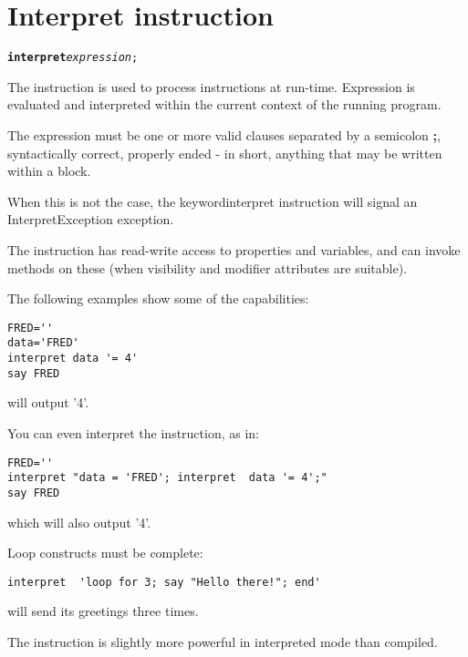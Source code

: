 \section{Interpret instruction}\label{refinterpret}
\index{}
\index{,}
\index{,}
\begin{shaded}
\begin{alltt}
\textbf{interpret} \emph{expression};

\end{alltt}
\end{shaded}

The  instruction is used to process instructions at run-time.
Expression is evaluated and interpreted within the current context of the running program.

The expression must be one or more valid clauses separated by a semicolon \textbf{;}, syntactically correct, properly ended - in short,
anything that may be written within a  block.

When this is not the case, the keyword{interpret} instruction will signal an InterpretException exception.

The  instruction has read-write access to properties and variables, and can invoke methods
on these (when visibility and modifier attributes are suitable).

The following examples show some of the capabilities:

\begin{lstlisting}
FRED=''
data='FRED'
interpret data '= 4'
say FRED
\end{lstlisting}
will output '4'.

You can even interpret the  instruction, as in:

\begin{lstlisting}
FRED=''
interpret "data = 'FRED'; interpret  data '= 4';"
say FRED
\end{lstlisting}
which will also output '4'.

Loop constructs must be complete:

\begin{lstlisting}
interpret  'loop for 3; say "Hello there!"; end'
\end{lstlisting}
will send its greetings three times.

The  instruction is slightly more powerful in interpreted mode than compiled.

